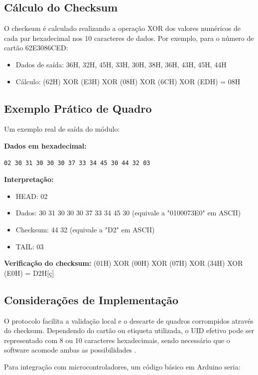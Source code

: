 \subsection{Cálculo do Checksum}

O checksum é calculado realizando a operação XOR dos valores numéricos de cada par hexadecimal nos 10 caracteres de dados. Por exemplo, para o número de cartão 62E3086CED:

\begin{itemize}
\item Dados de saída: 36H, 32H, 45H, 33H, 30H, 38H, 36H, 43H, 45H, 44H
\item Cálculo: (62H) XOR (E3H) XOR (08H) XOR (6CH) XOR (EDH) = 08H
\end{itemize}

\subsection{Exemplo Prático de Quadro}

Um exemplo real de saída do módulo:

\textbf{Dados em hexadecimal:}
\begin{verbatim}
02 30 31 30 30 30 37 33 34 45 30 44 32 03
\end{verbatim}

\textbf{Interpretação:}
\begin{itemize}
\item HEAD: 02
\item Dados: 30 31 30 30 30 37 33 34 45 30 (equivale a "0100073E0" em ASCII)
\item Checksum: 44 32 (equivale a "D2" em ASCII)
\item TAIL: 03
\end{itemize}

\textbf{Verificação do checksum:}
(01H) XOR (00H) XOR (07H) XOR (34H) XOR (E0H) = D2H[ç]

\subsection{Considerações de Implementação}

O protocolo facilita a validação local e o descarte de quadros corrompidos através do checksum. Dependendo do cartão ou etiqueta utilizada, o UID efetivo pode ser representado com 8 ou 10 caracteres hexadecimais, sendo necessário que o software acomode ambas as possibilidades \cite{seeed-rfid-125khz}.

Para integração com microcontroladores, um código básico em Arduino seria:

